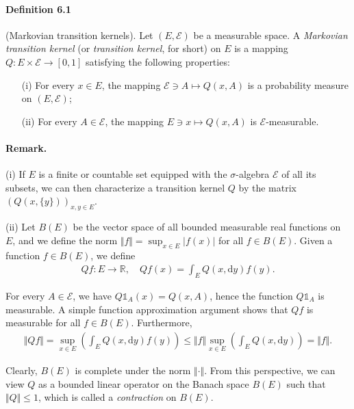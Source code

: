 \documentclass{article}
\numberwithin{equation}{section}
\renewcommand{\d}{\mathrm{d}}
\theoremstyle{plain}
\theoremstyle{definition}
\begin{document}
\paragraph{Definition 6.1\label{def:6.1}} (Markovian transition kernels). Let $(E,\mathscr{E})$ be a measurable space. A \textit{Markovian transition kernel} (or \textit{transition kernel}, for short) on $E$ is a mapping $Q:E\times\mathscr{E}\to[0,1]$ satisfying the following properties:
\begin{itemize}
	\item[(i)] For every $x\in E$, the mapping $\mathscr{E}\ni A\mapsto Q(x,A)$ is a probability measure on $(E,\mathscr{E})$;
	\item[(ii)] For every $A\in\mathscr{E}$, the mapping $E\ni x\mapsto Q(x,A)$ is $\mathscr{E}$-measurable.
\end{itemize} 
\paragraph{Remark.} (i) If $E$ is a finite or countable set equipped with the $\sigma$-algebra $\mathscr{E}$ of all its subsets, we can  then characterize a transition kernel $Q$ by the matrix $(Q(x,\{y\}))_{x,y\in E}$.

(ii) Let $B(E)$ be the vector space of all bounded measurable real functions on $E$, and we define the norm $\Vert f\Vert=\sup_{x\in E}\vert f(x)\vert$ for all $f\in B(E)$. Given a function $f\in B(E)$, we define
\begin{align*}
	Qf:E\to\mathbb{R},\quad Qf(x)=\int_E Q(x,\d y)f(y).
\end{align*}

For every $A\in\mathscr{E}$, we have $Q\mathds{1}_A(x)=Q(x,A)$, hence the function $Q\mathds{1}_A$ is measurable. A simple function approximation argument shows that $Qf$ is measurable for all $f\in B(E)$. Furthermore,
\begin{align*}
	\Vert Qf\Vert = \sup_{x\in E}\left(\int_E Q(x,\d y)f(y)\right)\leq \Vert f\Vert\sup_{x\in E}\left(\int_E Q(x,\d y)\right) = \Vert f\Vert.
\end{align*}

Clearly, $B(E)$ is complete under the norm $\Vert\cdot\Vert$. From this perspective, we can view $Q$ as a bounded linear operator on the Banach space $B(E)$ such that $\Vert Q\Vert\leq 1$, which is called a \textit{contraction} on $B(E)$.
\end{document}
